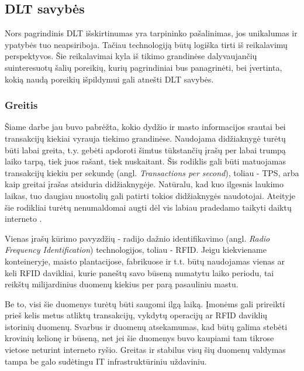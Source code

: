 
\subsection{DLT savybės}

Nors pagrindinis DLT išskirtinumas yra tarpininko pašalinimas, jos unikalumas ir ypatybės tuo neapsiriboja. Tačiau technologiją būtų logiška tirti iš reikalavimų perspektyvos. Šie reikalavimai kyla iš tikimo grandinėse dalyvaujančių suinteresuotų šalių poreikių, kurių pagrindiniai bus panagrinėti, bei įvertinta, kokią naudą poreikių išpildymui gali atnešti DLT savybės.




\subsubsection{Greitis}

Šiame darbe jau buvo pabrėžta, kokio dydžio ir masto informacijos srautai bei transakcijų kiekiai vyrauja tiekimo grandinėse. Naudojama didžiaknygė turėtų būti labai greita, t.y. gebėti apdoroti šimtus tūkstančių įrašų per labai trumpą laiko tarpą, tiek juos rašant, tiek nuskaitant. Šis rodiklis gali būti matuojamas transakcijų kiekiu per sekundę (angl. \textit{Transactions per second}), toliau - TPS, arba kaip greitai įrašas atsiduria didžiaknygėje. Natūralu, kad kuo ilgesnis laukimo laikas, tuo daugiau nuostolių gali patirti tokios didžiaknygės naudotojai. Ateityje šie rodikliai turėtų nenumaldomai augti dėl vis labiau pradedamo taikyti daiktų interneto \cite{kaur2018edge}. 

Vienas įrašų kūrimo pavyzdžių - radijo dažnio identifikavimo (angl. \textit{Radio Frequency Identification}) technologijos, toliau - RFID. Jeigu kiekviename konteineryje, maisto plantacijose, fabrikuose ir t.t. būtų naudojamas vienas ar keli RFID davikliai, kurie paneštų savo būseną numatytu laiko periodu, tai reikštų milijardinius duomenų kiekius per parą pasauliniu mastu.

Be to, visi šie duomenys turėtų būti saugomi ilgą laiką. Įmonėms gali prireikti prieš kelis metus atliktų transakcijų, vykdytų operacijų ar RFID daviklių istorinių duomenų. Svarbus ir duomenų atsekamumas, kad būtų galima stebėti krovinių kelionę ir būseną, net jei šie duomenys buvo kaupiami tam tikrose vietose neturint interneto ryšio. Greitas ir stabilus visų šių duomenų valdymas tampa be galo sudėtingu IT infrastruktūriniu uždaviniu.

